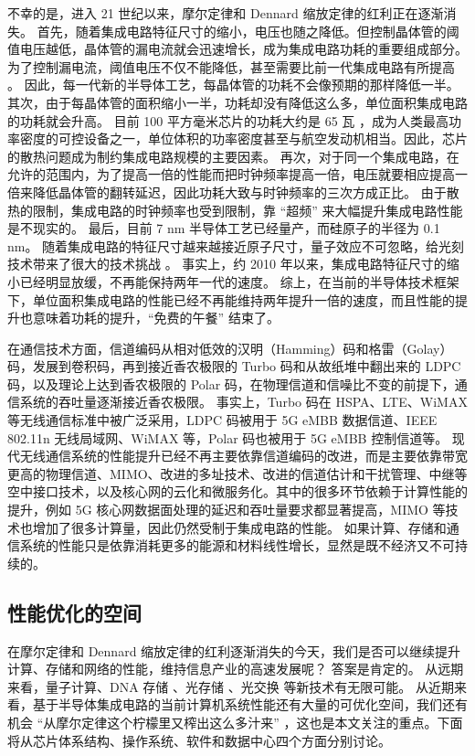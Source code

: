 不幸的是，进入 21 世纪以来，摩尔定律和 Dennard 缩放定律的红利正在逐渐消失。
首先，随着集成电路特征尺寸的缩小，电压也随之降低。但控制晶体管的阈值电压越低，晶体管的漏电流就会迅速增长，成为集成电路功耗的重要组成部分。
为了控制漏电流，阈值电压不仅不能降低，甚至需要比前一代集成电路有所提高 \cite{borkar1999design}。
因此，每一代新的半导体工艺，每晶体管的功耗不会像预期的那样降低一半。
其次，由于每晶体管的面积缩小一半，功耗却没有降低这么多，单位面积集成电路的功耗就会升高。
目前 100 平方毫米芯片的功耗大约是 65 瓦 \cite{borkar2011future}，成为人类最高功率密度的可控设备之一，单位体积的功率密度甚至与航空发动机相当。因此，芯片的散热问题成为制约集成电路规模的主要因素。
再次，对于同一个集成电路，在允许的范围内，为了提高一倍的性能而把时钟频率提高一倍，电压就要相应提高一倍来降低晶体管的翻转延迟，因此功耗大致与时钟频率的三次方成正比。
由于散热的限制，集成电路的时钟频率也受到限制，靠 ``超频'' 来大幅提升集成电路性能是不现实的。
最后，目前 7 nm 半导体工艺已经量产，而硅原子的半径为 0.1 nm。
随着集成电路的特征尺寸越来越接近原子尺寸，量子效应不可忽略，给光刻技术带来了很大的技术挑战 \cite{borkar2011future}。
事实上，约 2010 年以来，集成电路特征尺寸的缩小已经明显放缓，不再能保持两年一代的速度。
综上，在当前的半导体技术框架下，单位面积集成电路的性能已经不再能维持两年提升一倍的速度，而且性能的提升也意味着功耗的提升，``免费的午餐'' 结束了。

在通信技术方面，信道编码从相对低效的汉明（Hamming）码和格雷（Golay）码，发展到卷积码，再到接近香农极限的 Turbo 码和从故纸堆中翻出来的 LDPC 码，以及理论上达到香农极限的 Polar 码，在物理信道和信噪比不变的前提下，通信系统的吞吐量逐渐接近香农极限。
事实上，Turbo 码在 HSPA、LTE、WiMAX 等无线通信标准中被广泛采用，LDPC 码被用于 5G eMBB 数据信道、IEEE 802.11n 无线局域网、WiMAX 等，Polar 码也被用于 5G eMBB 控制信道等。
现代无线通信系统的性能提升已经不再主要依靠信道编码的改进，而是主要依靠带宽更高的物理信道、MIMO、改进的多址技术、改进的信道估计和干扰管理、中继等空中接口技术，以及核心网的云化和微服务化。其中的很多环节依赖于计算性能的提升，例如 5G 核心网数据面处理的延迟和吞吐量要求都显著提高，MIMO 等技术也增加了很多计算量，因此仍然受制于集成电路的性能。
如果计算、存储和通信系统的性能只是依靠消耗更多的能源和材料线性增长，显然是既不经济又不可持续的。

\subsection{性能优化的空间}

在摩尔定律和 Dennard 缩放定律的红利逐渐消失的今天，我们是否可以继续提升计算、存储和网络的性能，维持信息产业的高速发展呢？
答案是肯定的。
从远期来看，量子计算、DNA 存储 \cite{bornholt2016dna}、光存储 \cite{glass-a-new-media-for-a-new-era}、光交换 \cite{farrington2011helios} 等新技术有无限可能。
从近期来看，基于半导体集成电路的当前计算机系统性能还有大量的可优化空间，我们还有机会 ``从摩尔定律这个柠檬里又榨出这么多汁来'' \cite{threebody}，这也是本文关注的重点。下面将从芯片体系结构、操作系统、软件和数据中心四个方面分别讨论。

